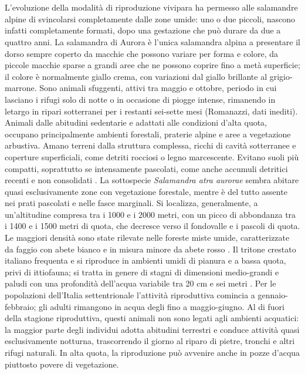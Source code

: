 \documentclass[10pt,twoside,openany,x11names,svgnames,italian,a5paper,dvipsnames,table]{memoir}
\begin{document}
\section*{}
L’evoluzione della modalità di riproduzione vivipara ha permesso alle salamandre alpine di svincolarsi completamente dalle zone umide: uno o due piccoli, nascono infatti completamente formati, dopo una gestazione che può durare da due a quattro anni. La salamandra di Aurora \cite{Trevisan82} è l'unica salamandra alpina a presentare il dorso sempre coperto da macchie che possono variare per forma e colore, da piccole macchie sparse a grandi aree che ne possono coprire fino a metà superficie; il colore è normalmente giallo crema, con variazioni dal giallo brillante al grigio-marrone. Sono animali sfuggenti, attivi tra maggio e ottobre, periodo in cui lasciano i rifugi solo di notte o in occasione di piogge intense, rimanendo in letargo in ripari sotterranei per i restanti sei-sette mesi (Romanazzi, dati inediti). Animali dalle abitudini sedentarie e adattati alle condizioni d’alta quota, occupano principalmente ambienti forestali, praterie alpine e aree a vegetazione arbustiva. Amano terreni dalla struttura complessa, ricchi di cavità sotterranee e coperture superficiali, come detriti rocciosi o legno marcescente. Evitano suoli più compatti, soprattutto se intensamente pascolati, come anche accumuli detritici recenti e non consolidati \cite{Beukema08} \cite{Bonato03} \cite{Bovero13}. 
La sottospecie \emph{Salamandra atra aurorae} sembra abitare quasi esclusivamente zone con vegetazione forestale, mentre è del tutto assente nei prati pascolati e nelle fasce marginali. Si localizza, generalmente, a un’altitudine compresa tra i 1000 e i 2000 metri, con un picco di abbondanza tra i 1400 e i 1500 metri di quota, che decresce verso il fondovalle e i pascoli di quota. Le maggiori densità sono state rilevate nelle foreste miste umide, caratterizzate da faggio con abete bianco e in misura minore da abete rosso \cite{Beukema08} \cite{Bonato03} \cite{Bonato00} \cite{Bovero13} \cite{Romanazzi14}.
Il tritone crestato italiano frequenta e si riproduce in ambienti umidi di pianura e a bassa quota, privi di ittiofauna; si tratta in genere di stagni di dimensioni medio-grandi e paludi con una profondità dell'acqua variabile tra 20 cm e sei metri \cite{Biasioli11} \cite{Bovero13} \cite{Damm07} \cite{Edgar06}. Per le popolazioni dell’Italia settentrionale l’attività riproduttiva comincia a gennaio-febbraio; gli adulti rimangono in acqua degli fino a maggio-giugno. Al di fuori della stagione riproduttiva, questi animali non sono legati agli ambienti acquatici: la maggior parte degli individui adotta abitudini terrestri e conduce attività quasi esclusivamente notturna, trascorrendo il giorno al riparo di pietre, tronchi e altri rifugi naturali. In alta quota, la riproduzione può avvenire anche in pozze d'acqua piuttosto povere di vegetazione.
\end{document}
